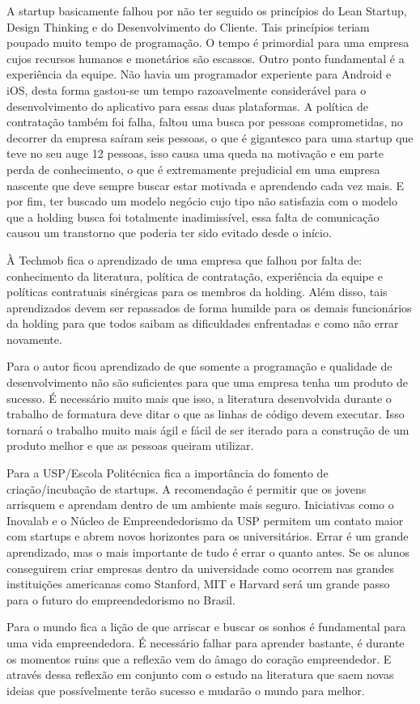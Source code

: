 A startup basicamente falhou por não ter seguido os princípios do Lean Startup, Design Thinking e do Desenvolvimento do Cliente. Tais princípios teriam poupado muito tempo de programação. O tempo é primordial para uma empresa cujos recursos humanos e monetários são escassos. Outro ponto fundamental é a experiência da equipe. Não havia um programador experiente para Android e iOS, desta forma gastou-se um tempo razoavelmente considerável para o desenvolvimento do aplicativo para essas duas plataformas. A política de contratação também foi falha, faltou uma busca por pessoas comprometidas, no decorrer da empresa saíram seis pessoas, o que é gigantesco para uma startup que teve no seu auge 12 pessoas, isso causa uma queda na motivação e em parte perda de conhecimento, o que é extremamente prejudicial em uma empresa nascente que deve sempre buscar estar motivada e aprendendo cada vez mais. E por fim, ter buscado um modelo negócio cujo tipo não satisfazia com o modelo que a holding busca foi totalmente inadimissível, essa falta de comunicação causou um transtorno que poderia ter sido evitado desde o início.

À Techmob fica o aprendizado de uma empresa que falhou por falta de: conhecimento da literatura, política de contratação, experiência da equipe e políticas contratuais sinérgicas para os membros da holding. Além disso, tais aprendizados devem ser repassados de forma humilde para os demais funcionários da holding para que todos saibam as dificuldades enfrentadas e como não errar novamente.

Para o autor ficou aprendizado de que somente a programação e qualidade de desenvolvimento não são suficientes para que uma empresa tenha um produto de sucesso. É necessário muito mais que isso, a literatura desenvolvida durante o trabalho de formatura deve ditar o que as linhas de código devem executar. Isso tornará o trabalho muito mais ágil e fácil de ser iterado para a construção de um produto melhor e que as pessoas queiram utilizar.

Para a USP/Escola Politécnica fica a importância do fomento de criação/incubação de startups. A recomendação é permitir que os jovens arrisquem e aprendam dentro de um ambiente mais seguro. Iniciativas como o Inovalab e o Núcleo de Empreendedorismo da USP permitem um contato maior com startups e abrem novos horizontes para os universitários. Errar é um grande aprendizado, mas o mais importante de tudo é errar o quanto antes. Se os alunos conseguirem criar empresas dentro da universidade como ocorrem nas grandes instituições americanas como Stanford, MIT e Harvard será um grande passo para o futuro do empreendedorismo no Brasil.

Para o mundo fica a lição de que arriscar e buscar os sonhos é fundamental para uma vida empreendedora. É necessário falhar para aprender bastante, é durante os momentos ruins que a reflexão vem do âmago do coração empreendedor. E através dessa reflexão em conjunto com o estudo na literatura que saem novas ideias que possívelmente terão sucesso e mudarão o mundo para melhor.
